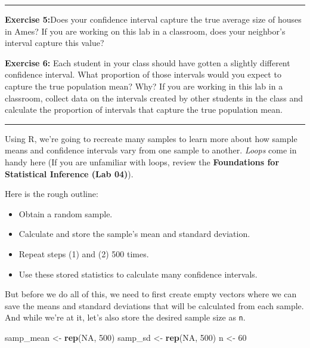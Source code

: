\documentclass[]{book}
\newenvironment{Shaded}{\begin{snugshade}}{\end{snugshade}}
\newcommand{\KeywordTok}[1]{\textcolor[rgb]{0.13,0.29,0.53}{\textbf{{#1}}}}
\newcommand{\DecValTok}[1]{\textcolor[rgb]{0.00,0.00,0.81}{{#1}}}
\newcommand{\StringTok}[1]{\textcolor[rgb]{0.31,0.60,0.02}{{#1}}}
\newcommand{\OtherTok}[1]{\textcolor[rgb]{0.56,0.35,0.01}{{#1}}}
\newcommand{\NormalTok}[1]{{#1}}
\providecommand{\tightlist}{%
  \setlength{\itemsep}{0pt}\setlength{\parskip}{0pt}}
\theoremstyle{definition}
\theoremstyle{definition}
\theoremstyle{definition}
\theoremstyle{remark}
\begin{document}
\begin{center}\rule{0.5\linewidth}{\linethickness}\end{center}

\textbf{Exercise 5:}Does your confidence interval capture the true
average size of houses in Ames? If you are working on this lab in a
classroom, does your neighbor's interval capture this value?

\textbf{Exercise 6:} Each student in your class should have gotten a
slightly different confidence interval. What proportion of those
intervals would you expect to capture the true population mean? Why? If
you are working in this lab in a classroom, collect data on the
intervals created by other students in the class and calculate the
proportion of intervals that capture the true population mean.

\begin{center}\rule{0.5\linewidth}{\linethickness}\end{center}

Using R, we're going to recreate many samples to learn more about how
sample means and confidence intervals vary from one sample to another.
\emph{Loops} come in handy here (If you are unfamiliar with loops,
review the \textbf{Foundations for Statistical Inference (Lab 04)}).

Here is the rough outline:

\begin{itemize}
\tightlist
\item
  Obtain a random sample.
\item
  Calculate and store the sample's mean and standard deviation.
\item
  Repeat steps (1) and (2) 500 times.
\item
  Use these stored statistics to calculate many confidence intervals.
\end{itemize}

But before we do all of this, we need to first create empty vectors
where we can save the means and standard deviations that will be
calculated from each sample. And while we're at it, let's also store the
desired sample size as \texttt{n}.

\begin{Shaded}
\begin{Highlighting}[]
\NormalTok{samp_mean <-}\StringTok{ }\KeywordTok{rep}\NormalTok{(}\OtherTok{NA}\NormalTok{, }\DecValTok{500}\NormalTok{)}
\NormalTok{samp_sd <-}\StringTok{ }\KeywordTok{rep}\NormalTok{(}\OtherTok{NA}\NormalTok{, }\DecValTok{500}\NormalTok{)}
\NormalTok{n <-}\StringTok{ }\DecValTok{60}
\end{Highlighting}
\end{Shaded}
\end{document}
